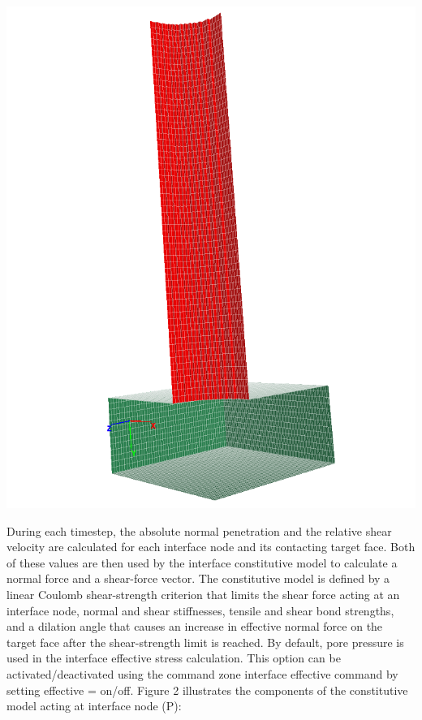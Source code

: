 \documentclass[a4paper, nobind]{templates/ociamthesis}
\begin{document}
\includegraphics[width=1\linewidth]{myfigureeeeee/interface-both}

During each timestep, the absolute normal penetration and the relative
shear velocity are calculated for each interface node and its contacting
target face. Both of these values are then used by the interface
constitutive model to calculate a normal force and a shear-force vector.
The constitutive model is defined by a linear Coulomb shear-strength
criterion that limits the shear force acting at an interface node,
normal and shear stiffnesses, tensile and shear bond strengths, and a
dilation angle that causes an increase in effective normal force on the
target face after the shear-strength limit is reached. By default, pore
pressure is used in the interface effective stress calculation. This
option can be activated/deactivated using the command zone interface
effective command by setting effective = on/off. Figure 2 illustrates
the components of the constitutive model acting at interface node (P):
\end{document}
